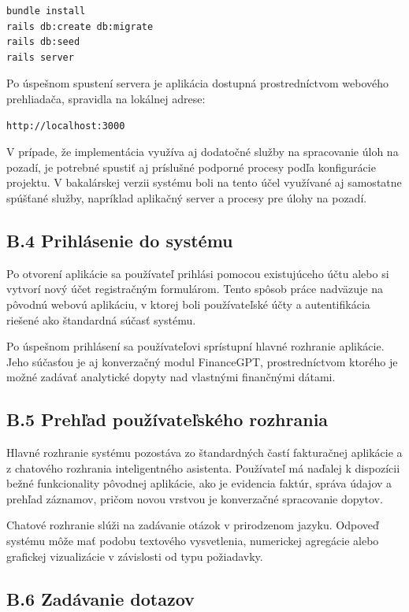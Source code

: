 \begin{verbatim}
bundle install
rails db:create db:migrate
rails db:seed
rails server
\end{verbatim}

Po úspešnom spustení servera je aplikácia dostupná prostredníctvom webového
prehliadača, spravidla na lokálnej adrese:

\begin{verbatim}
http://localhost:3000
\end{verbatim}

V prípade, že implementácia využíva aj dodatočné služby na spracovanie úloh na pozadí,
je potrebné spustiť aj príslušné podporné procesy podľa konfigurácie projektu. V bakalárskej
verzii systému boli na tento účel využívané aj samostatne spúšťané služby,
napríklad aplikačný server a procesy pre úlohy na pozadí.

\subsection*{B.4 Prihlásenie do systému}

Po otvorení aplikácie sa používateľ prihlási pomocou existujúceho účtu alebo si vytvorí
nový účet registračným formulárom. Tento spôsob práce nadväzuje na pôvodnú
webovú aplikáciu, v ktorej boli používateľské účty a autentifikácia riešené ako štandardná
súčasť systému.

Po úspešnom prihlásení sa používateľovi sprístupní hlavné rozhranie aplikácie.
Jeho súčasťou je aj konverzačný modul FinanceGPT, prostredníctvom ktorého je možné
zadávať analytické dopyty nad vlastnými finančnými dátami.

\subsection*{B.5 Prehľad používateľského rozhrania}

Hlavné rozhranie systému pozostáva zo štandardných častí fakturačnej aplikácie a
z chatového rozhrania inteligentného asistenta. Používateľ má naďalej k dispozícii
bežné funkcionality pôvodnej aplikácie, ako je evidencia faktúr, správa údajov a prehľad
záznamov, pričom novou vrstvou je konverzačné spracovanie dopytov.

Chatové rozhranie slúži na zadávanie otázok v prirodzenom jazyku. Odpoveď systému
môže mať podobu textového vysvetlenia, numerickej agregácie alebo grafickej
vizualizácie v závislosti od typu požiadavky.

\subsection*{B.6 Zadávanie dotazov}

